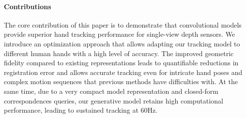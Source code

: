 \paragraph{Contributions}
%
The core contribution of this paper is to demonstrate that convolutional models provide superior hand tracking performance for single-view depth  sensors.  We introduce an optimization approach that allows adapting our tracking model to different human hands with a high level of accuracy. 
The improved geometric fidelity compared to existing representations leads to quantifiable reductions in registration error and allows accurate tracking even for intricate hand poses and complex motion sequences that previous methods have difficulties with. 
At the same time, due to a very compact model representation and closed-form correspondences queries, our generative model retains high computational performance, leading to sustained tracking at 60Hz.



